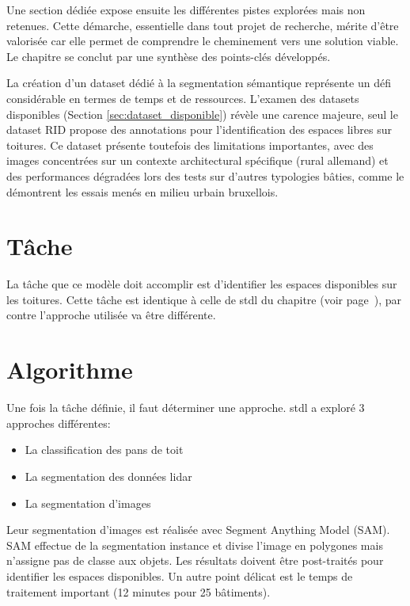 Une section dédiée expose ensuite les différentes pistes explorées mais non retenues. Cette démarche, essentielle dans tout projet de recherche, mérite d'être valorisée car elle permet de comprendre le cheminement vers une solution viable. Le chapitre se conclut par une synthèse des points-clés développés.

La création d'un dataset dédié à la segmentation sémantique représente un défi considérable en termes de temps et de ressources. L'examen des datasets disponibles (Section \ref{sec:dataset_disponible}) révèle une carence majeure, seul le dataset RID propose des annotations pour l'identification des espaces libres sur toitures. Ce dataset présente toutefois des limitations importantes, avec des images concentrées sur un contexte architectural spécifique (rural allemand) et des performances dégradées lors des tests sur d'autres typologies bâties, comme le démontrent les essais menés en milieu urbain bruxellois.

\section{Tâche}
La tâche que ce modèle doit accomplir est d'identifier les espaces disponibles sur les toitures. Cette tâche est identique à celle de \acrshort{stdl} du chapitre \textit{} (voir page~\pageref{subsec:stdl_analyse}), par contre l'approche utilisée va être différente.

\section{Algorithme}
Une fois la tâche définie, il faut déterminer une approche. \acrshort{stdl} a exploré 3 approches différentes:
\begin{itemize}
    \item La classification des pans de toit
    \item La segmentation des données \gls{lidar}
    \item La segmentation d'images
\end{itemize}

Leur segmentation d'images est réalisée avec Segment Anything Model (SAM). SAM effectue de la segmentation instance et divise l'image en polygones mais n'assigne pas de classe aux objets. Les résultats doivent être post-traités pour identifier les espaces disponibles. Un autre point délicat est le temps de traitement important (12 minutes pour 25 bâtiments).

